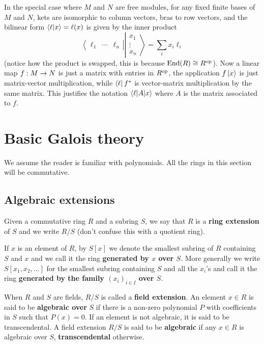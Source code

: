 In the special case where $M$ and $N$ are free modules, for any fixed
finite bases of $M$ and $N$, kets are isomorphic to column vectors,
bras to row vectors, and the bilinear form $\left\langle \ell \middle| x \right\rangle=\ell(x)$
is given by the inner product
\begin{equation*}
  \left\langle\begin{matrix}
      \ell_1 &\cdots & \ell_n
    \end{matrix}\right\rvert
  \left\lvert\begin{matrix}
    x_1\\
    \vdots\\
    x_n
  \end{matrix}\right\rangle
  =
  \sum_i x_i\ell_i
\end{equation*}
(notice how the product is swapped, this is because $\operatorname{End}(R)\cong
R^{\mathrm{op}}$).  Now a linear map $f:M\rightarrow N$ is just a matrix with entries in
$R^{\mathrm{op}}$, the application $f\left\lvert x \right\rangle$ is just matrix-vector
multiplication, while $\left\langle \ell \right\rvert f^\ast$ is vector-matrix
multiplication by the same matrix. This justifies the notation
$\left\langle \ell \middle| A \middle| x \right\rangle$ where $A$ is the matrix associated to $f$.


\section{Basic Galois theory}
\label{sec:basic-galois-theory}

We assume the reader is familiar with polynomials. All the rings in
this section will be commutative.

\subsection{Algebraic extensions}
\label{sec:basic-galois-theory:algebraic-extensions}
Given a commutative ring $R$ and a subring $S$, we say that $R$ is a
 \textbf{ring
  extension} of $S$ and we write $R/S$ (don't confuse this with a
quotient ring). 

If $x$ is an element of $R$, by $S[x]$ we denote the smallest subring
of $R$ containing $S$ and $x$ and we call it the ring
\textbf{generated by $x$ over $S$}. More
generally we write $S[x_1,x_2,\ldots]$ for the smallest subring
containing $S$ and all the $x_i$'s and call it the ring \textbf{generated by
the family $(x_i)_{i\in I}$ over $S$}.

When $R$ and $S$ are fields, $R/S$ is called a
 \textbf{field
  extension}. An element $x\in R$ is said to be
\textbf{algebraic over} $S$ if there is a
non-zero polynomial $P$ with coefficients in $S$ such that
$P(x)=0$. If an element is not algebraic, it is said to be
transcendental. A field extension $R/S$
is said to be \textbf{algebraic} if any
$x\in R$ is algebraic over $S$,
\textbf{transcendental} otherwise.


